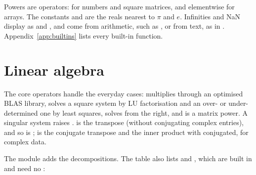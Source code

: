\documentclass[11pt,a4paper,openany]{report}
\begin{document}
{{Powers are operators:  for numbers and square matrices, and
 elementwise for arrays. The constants  and  are
the reals nearest to $\pi$ and $e$. Infinities and NaN display as
 and , and come from arithmetic, such as ,
or from text, as in . Appendix~\ref{app:builtins} lists every built-in function.

\section{Linear algebra}\label{sec:linalg}

The core operators handle the everyday cases:  multiplies through
an optimised BLAS library,  solves a square system by LU
factorisation and an over- or under-determined one by least squares,
 solves from the right, and  is a matrix power. A
singular system raises .  is the transpose
(without conjugating complex entries), and so is ;
 is the conjugate transpose and  the inner
product with  conjugated, for complex data.

The  module adds the decompositions. The table also lists
 and , which are built in and need no :

}}
\end{document}
